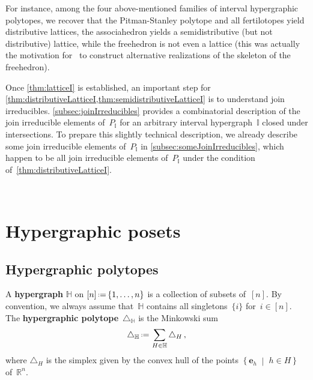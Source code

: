 \documentclass[reqno]{amsart}
\theoremstyle{definition}
\newcommand{\R}{\mathbb{R}} %
\renewcommand{\b}[1]{\boldsymbol{#1}} %
\newcommand{\set}[2]{\left\{ #1 \;\middle|\; #2 \right\}} %
\newcommand{\eqdef}{\mbox{\,\raisebox{0.2ex}{\scriptsize\ensuremath{\mathrm:}}\ensuremath{=}\,}} %
\newcommand{\simplex}{\triangle} %
\newcommand{\defn}[1]{\textbf{\textsf{\color{PineGreen} #1}}} %
\newcommand{\vincent}[1]{\todo[size=\tiny,color=blue!30]{ #1 \\ \hfill --- V.}\,}
\newcommand{\HH}{\mathbb H}  %
\newcommand{\II}{\mathbb I} %
\begin{document}
For instance, among the four above-mentioned families of interval hypergraphic polytopes, we recover that  the Pitman-Stanley polytope and all fertilotopes yield distributive lattices, the associahedron yields a semidistributive (but not distributive) lattice, while the freehedron is not even a lattice (this was actually the motivation for~\cite{PilaudPoliakova} to construct alternative realizations of the skeleton of the freehedron).

Once \cref{thm:latticeI} is established, an important step for \cref{thm:distributiveLatticeI,thm:semidistributiveLatticeI} is to understand join irreducibles.
\cref{subsec:joinIrreducibles} provides a combinatorial description of the join irreducible elements of~$P_\II$ for an arbitrary interval hypergraph~$\II$ closed under intersections.
To prepare this slightly technical description, we already describe some join irreducible elements of~$P_\II$ in \cref{subsec:someJoinIrreducibles}, which happen to be all join irreducible elements of~$P_\II$ under the condition of~\cref{thm:distributiveLatticeI}.

\vincent{In progress}

\setcounter{theoremA}{0}


\pagebreak
\section{Hypergraphic posets}
\label{sec:HP}


\subsection{Hypergraphic polytopes}
\label{subsec:D_H}

A \defn{hypergraph} $\HH$ on $[n] \eqdef \{1, \dots, n\}$ is a collection of  subsets of~$[n]$.
By convention, we always assume that~$\HH$ contains all singletons~$\{i\}$ for~$i\in [n]$.
The \defn{hypergraphic polytope}~$\simplex_\HH$ is the Minkowski sum
\[
\simplex_\HH \eqdef \sum_{H\in \HH} \simplex_H\,,
\]
where $\simplex_H$ is the simplex given by the convex hull of the points $\set{\b{e}_h}{h \in H}$ of~$\R^n$.
\end{document}
